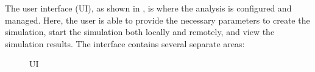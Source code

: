The user interface (UI), as shown in , is where the analysis
is configured and managed. Here, the user is able to provide the necessary
parameters to create the simulation, start the simulation both locally and
remotely, and view the simulation results. The interface contains several
separate areas:

\begin{figure}[!htbp]
  \caption{UI}
  \label{fig:figure1}
\end{figure}

